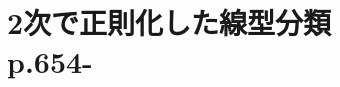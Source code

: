 \documentclass[dvipdfmx,8pt]{beamer}
\begin{document}
  \section{2次で正則化した線型分類\\p.654-}
  \begin{frame}

  \end{frame}

\end{document}
